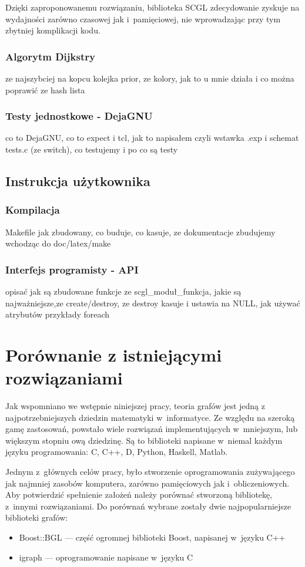 \documentclass[a4paper,12pt,polish,oneside]{thesis}
\begin{document}
Dzięki zaproponowanemu rozwiązaniu, biblioteka SCGL zdecydowanie zyskuje na wydajności zarówno czasowej jak i~pamięciowej, nie wprowadzając przy tym zbytniej komplikacji kodu.

\subsection{Algorytm Dijkstry}
ze najszybciej na kopcu kolejka prior, ze kolory, jak to u mnie działa i co można poprawić ze hash lista
\subsection{Testy jednostkowe - DejaGNU}
co to DejaGNU, co to expect i tcl, jak to napisałem czyli wstawka .exp i schemat tests.c (ze switch), co testujemy i po co są testy
\section{Instrukcja użytkownika}
\subsection{Kompilacja}
Makefile jak zbudowany, co buduje, co kasuje, ze dokumentacje zbudujemy wchodząc do doc/latex/make 
\subsection{Interfejs programisty - API}
opisać jak są zbudowane funkcje ze scgl\_moduł\_funkcja, jakie są najważniejsze,ze create/destroy, ze destroy kasuje i ustawia na NULL, jak używać atrybutów przykłady foreach 

\chapter{Porównanie z istniejącymi rozwiązaniami}
Jak wspomniano we wstępnie niniejszej pracy, teoria grafów jest jedną z najpotrzebniejszych dziedzin matematyki w~informatyce.
Ze względu na szeroką gamę zastosowań, powstało wiele rozwiązań implementujących w~mniejszym, lub większym stopniu ową dziedzinę.
Są to biblioteki napisane w~niemal każdym języku programowania: C, C++, D, Python, Haskell, Matlab.

Jednym z~głównych celów pracy, było stworzenie oprogramowania zużywającego jak najmniej zasobów komputera, zarówno pamięciowych jak i~obliczeniowych.
Aby potwierdzić spełnienie założeń należy porównać stworzoną bibliotekę, z~innymi rozwiązaniami.
Do porównań wybrane zostały dwie najpopularniejsze biblioteki grafów:
\begin{itemize}
	\item Boost::BGL --- część ogromnej biblioteki Boost, napisanej w~języku C++
	\item igraph --- oprogramowanie napisane w~języku C
\end{itemize}
\end{document}
